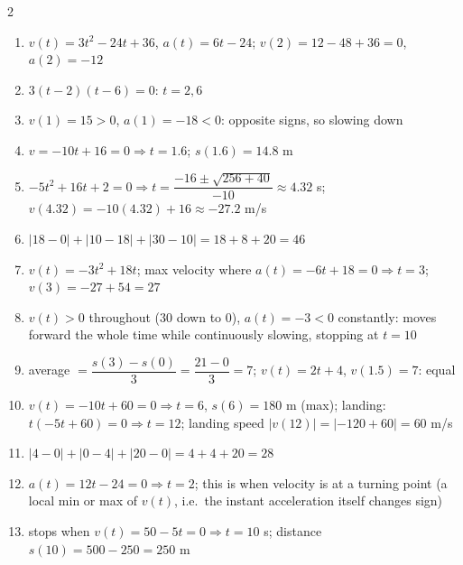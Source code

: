 \documentclass[11pt]{article}
\begin{document}
\begin{keybox}
\begin{multicols}{2}
\small
\begin{enumerate}[leftmargin=*,itemsep=3pt]
  \item $v(t)=3t^2-24t+36$, $a(t)=6t-24$; $v(2)=12-48+36=0$, $a(2)=-12$
  \item $3(t-2)(t-6)=0$: $t=2,6$
  \item $v(1)=15>0$, $a(1)=-18<0$: opposite signs, so slowing down
  \item $v=-10t+16=0\Rightarrow t=1.6$; $s(1.6)=14.8$ m
  \item $-5t^2+16t+2=0\Rightarrow t=\dfrac{-16\pm\sqrt{256+40}}{-10}\approx4.32$ s; $v(4.32)=-10(4.32)+16\approx-27.2$ m/s
  \item $|18-0|+|10-18|+|30-10|=18+8+20=46$
  \item $v(t)=-3t^2+18t$; max velocity where $a(t)=-6t+18=0\Rightarrow t=3$; $v(3)=-27+54=27$
  \item $v(t)>0$ throughout (30 down to 0), $a(t)=-3<0$ constantly: moves forward the whole time while continuously slowing, stopping at $t=10$
  \item average $=\dfrac{s(3)-s(0)}{3}=\dfrac{21-0}{3}=7$; $v(t)=2t+4$, $v(1.5)=7$: equal
  \item $v(t)=-10t+60=0\Rightarrow t=6$, $s(6)=180$ m (max); landing: $t(-5t+60)=0\Rightarrow t=12$; landing speed $|v(12)|=|-120+60|=60$ m/s
  \item $|4-0|+|0-4|+|20-0|=4+4+20=28$
  \item $a(t)=12t-24=0\Rightarrow t=2$; this is when velocity is at a turning point (a local min or max of $v(t)$, i.e.\ the instant acceleration itself changes sign)
  \item stops when $v(t)=50-5t=0\Rightarrow t=10$ s; distance $s(10)=500-250=250$ m
\end{enumerate}
\end{multicols}
\end{keybox}
\end{document}
